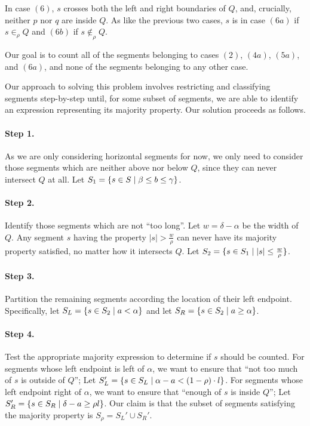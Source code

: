 In case $(6)$, $s$ crosses both the left and right boundaries of $Q$, and, crucially, neither $p$ nor $q$ are inside $Q$. As like the previous two cases, $s$ is in case $(6a)$ if $s \in_\rho Q$ and $(6b)$ if $s \not \in_\rho Q$.

Our goal is to count all of the segments belonging to cases $(2)$, $(4a)$, $(5a)$, and $(6a)$, and none of the segments belonging to any other case.

Our approach to solving this problem involves restricting and classifying segments step-by-step until, for some subset of segments, we are able to identify an expression representing its majority property.  Our solution proceeds as follows.

\paragraph{Step 1.} As we are only considering horizontal segments for now, we only need to consider those segments which are neither above nor below $Q$, since they can never intersect $Q$ at all. Let $S_1 = \{ s \in S \;|\; \beta \leq b \leq \gamma\}$. 

\paragraph{Step 2.} Identify those segments which are not ``too long''.  Let $w = \delta - \alpha$ be the width of $Q$.  Any segment $s$ having the property $|s| > \frac{w}{\rho}$ can never have its majority property satisfied, no matter how it intersects $Q$.  Let $S_2 = \{ s \in S_1 \;|\; |s| \leq \frac{w}{\rho} \}$.

\paragraph{Step 3.} Partition the remaining segments according the location of their left endpoint.  Specifically, let $S_L = \{s \in S_2 \;|\; a < \alpha \}$ and let $S_R = \{ s \in S_2 \;|\; a \geq \alpha \}$.

\paragraph{Step 4.} Test the appropriate majority expression to determine if $s$ should be counted. For segments whose left endpoint is left of $\alpha$, we want to ensure that ``not too much of $s$ is outside of $Q$''; Let $S_L' = \{ s \in S_L \;|\; \alpha - a < (1 - \rho) \cdot l\}$. For segments whose left endpoint right of $\alpha$, we want to ensure that ``enough of $s$ is inside $Q$''; Let $S_R' = \{ s \in S_R \;|\; \delta - a \geq  \rho l \}$. Our claim is that the subset of segments satisfying the majority property is $S_\rho = S_L' \cup S_R'$. 

